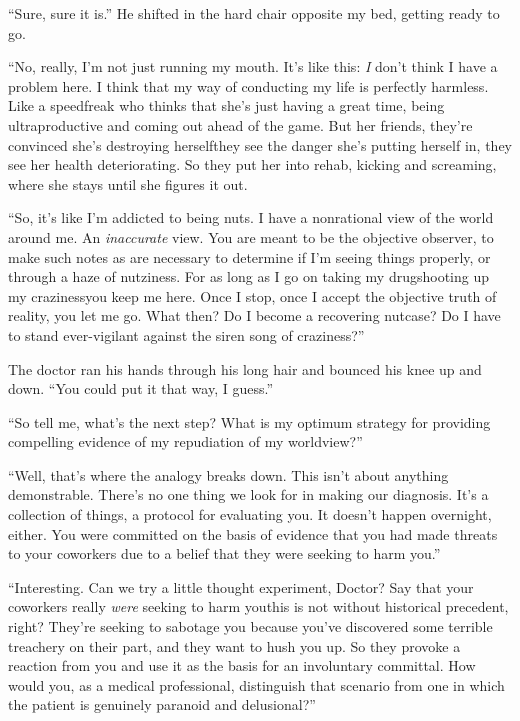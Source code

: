 “Sure, sure it is.” He shifted in the hard chair opposite my bed,
getting ready to go.

“No, really, I’m not just running my mouth. It’s like this:
\emph{I} don’t think I have a problem here. I think that my way of
conducting my life is perfectly harmless. Like a speedfreak who
thinks that she’s just having a great time, being ultraproductive
and coming out ahead of the game. But her friends, they’re
convinced she’s destroying herself{\dash}they see the danger she’s
putting herself in, they see her health deteriorating. So they put
her into rehab, kicking and screaming, where she stays until she
figures it out.

“So, it’s like I’m addicted to being nuts. I have a nonrational
view of the world around me. An \emph{inaccurate} view. You are
meant to be the objective observer, to make such notes as are
necessary to determine if I’m seeing things properly, or through a
haze of nutziness. For as long as I go on taking my drug{\dash}shooting
up my craziness{\dash}you keep me here. Once I stop, once I accept the
objective truth of reality, you let me go. What then? Do I become a
recovering nutcase? Do I have to stand ever-vigilant against the
siren song of craziness?”

The doctor ran his hands through his long hair and bounced his knee
up and down. “You could put it that way, I guess.”

“So tell me, what’s the next step? What is my optimum strategy for
providing compelling evidence of my repudiation of my worldview?”

“Well, that’s where the analogy breaks down. This isn’t about
anything demonstrable. There’s no one thing we look for in making
our diagnosis. It’s a collection of things, a protocol for
evaluating you. It doesn’t happen overnight, either. You were
committed on the basis of evidence that you had made threats to
your coworkers due to a belief that they were seeking to harm
you.”

“Interesting. Can we try a little thought experiment, Doctor? Say
that your coworkers really \emph{were} seeking to harm you{\dash}this is
not without historical precedent, right? They’re seeking to
sabotage you because you’ve discovered some terrible treachery on
their part, and they want to hush you up. So they provoke a
reaction from you and use it as the basis for an involuntary
committal. How would you, as a medical professional, distinguish
that scenario from one in which the patient is genuinely paranoid
and delusional?”

